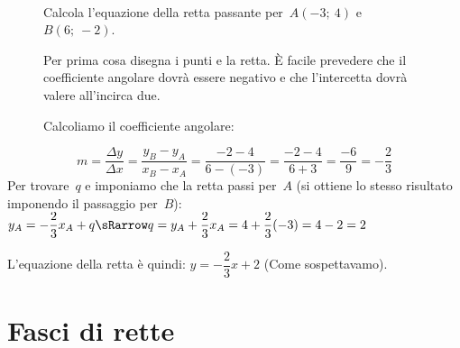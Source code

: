  \begin{esempio}
~

\begin{inaccessibleblock}
 \begin{figure}[h]
 \centering
 \begin{minipage}[]{.30\textwidth}
Calcola l'equazione della retta passante per~\(A(-3;~4)\) e~\(B(6;~-2)\).

\vspace{1em}
Per prima cosa disegna i punti e la retta. È facile prevedere che il 
coefficiente angolare dovrà essere negativo e che l'intercetta dovrà valere
all'incirca due.

\vspace{1em}
Calcoliamo il coefficiente angolare:
 \end{minipage}
 \begin{minipage}[]{.60\textwidth}
   \centering \rettac
 \end{minipage}
\label{fig:metodorapido}
\end{figure}
\end{inaccessibleblock}
\[m = \frac{\Delta y}{\Delta x} = \frac{y_B - y_A}{x_B - x_A} =
      \frac{-2 - 4}{6 -(-3)} = \frac{-2 - 4}{6 + 3} = \frac{-6}{9} = 
      - \frac{2}{3}
\]
Per trovare~\(q\) e imponiamo che la retta passi per~\(A\) 
(si ottiene lo stesso risultato imponendo il passaggio per~\(B\)): \quad
\(y_A = - \dfrac{2}{3} x_A + q \sRarrow 
    q = y_A +\dfrac{2}{3} x_A = 4 +\dfrac{2}{3} (-3) = 4 - 2 = 2\)

\noindent L'equazione della retta è quindi: \quad
\(y = - \dfrac{2}{3} x + 2\) \quad
(Come sospettavamo).
 \end{esempio}

% 


\section{Fasci di rette}
\label{sec:retta_fasci}

